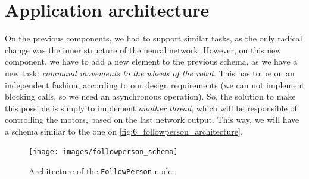 \section{Application architecture}
	On the previous components, we had to support similar tasks, as the only radical change was the inner structure of the neural network. However, on this new component, we have to add a new element to the previous schema, as we have a new task: \emph{command movements to the wheels of the robot}. This has to be on an independent fashion, according to our design requirements (we can not implement blocking calls, so we need an asynchronous operation). So, the solution to make this possible is simply to implement \emph{another thread}, which will be responsible of controlling the motors, based on the last network output. This way, we will have a schema similar to the one on \autoref{fig:6_followperson_architecture}.
	
	\begin{figure}[h]
		\centering
		\texttt{[image: images/followperson\_schema]}
		\caption{Architecture of the \texttt{FollowPerson} node.}
		\label{fig:6_followperson_architecture}
	\end{figure}
	

